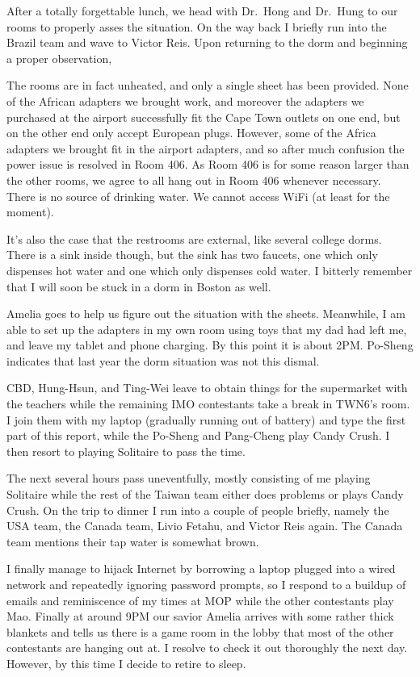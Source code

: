 \documentclass[11pt]{scrreprt}
\numberwithin{figure}{chapter}
\begin{document}
After a totally forgettable lunch, we head with Dr.\ Hong and Dr.\ Hung to our rooms to properly asses the situation.
On the way back I briefly run into the Brazil team and wave to Victor Reis.
Upon returning to the dorm and beginning a proper observation,
\begin{enumerate}[(i)]
  \ii The rooms are in fact unheated, and only a single sheet has been provided.
  \ii None of the African adapters we brought work, and moreover the adapters we purchased at the airport
  successfully fit the Cape Town outlets on one end, but on the other end only accept European plugs.
  However, some of the Africa adapters we brought fit in the airport adapters, and so after much confusion
  the power issue is resolved in Room 406. As Room 406 is for some reason larger than the other rooms, we agree
  to all hang out in Room 406 whenever necessary.
  \ii There is no source of drinking water.
  \ii We cannot access WiFi (at least for the moment).
\end{enumerate}
It's also the case that the restrooms are external, like several college dorms.
There is a sink inside though, but the sink has two faucets, one which only dispenses hot water and one which
only dispenses cold water.  I bitterly remember that I will soon be stuck in a dorm in Boston as well.

Amelia goes to help us figure out the situation with the sheets.
Meanwhile, I am able to set up the adapters in my own room using toys that my dad had left me, and leave my
tablet and phone charging.
By this point it is about 2PM.
Po-Sheng indicates that last year the dorm situation was not this dismal.

CBD, Hung-Hsun, and Ting-Wei leave to obtain things for the supermarket with the teachers while the remaining IMO
contestants take a break in TWN6's room. I join them with my laptop (gradually running out of battery) and type
the first part of this report, while the Po-Sheng and Pang-Cheng play Candy Crush.
I then resort to playing Solitaire to pass the time.

The next several hours pass uneventfully, mostly consisting of me playing Solitaire while the rest of the Taiwan
team either does problems or plays Candy Crush. On the trip to dinner I run into a couple of people briefly,
namely the USA team, the Canada team, Livio Fetahu, and Victor Reis again.
The Canada team mentions their tap water is somewhat brown.

I finally manage to hijack Internet by borrowing a laptop plugged into a wired network and repeatedly ignoring password
prompts, so I respond to a buildup of emails and reminiscence of my times at MOP while the other contestants play Mao.
Finally at around 9PM our savior Amelia arrives with some rather thick blankets and tells us there is a game room in
the lobby that most of the other contestants are hanging out at. I resolve to check it out thoroughly the next day.
However, by this time I decide to retire to sleep.
\end{document}
